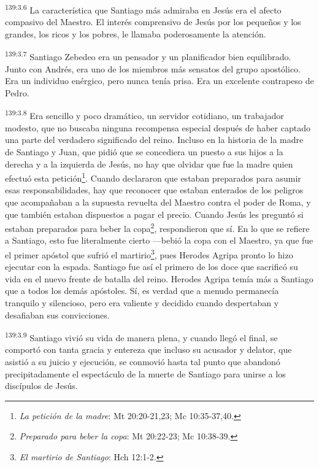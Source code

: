 \par 
\textsuperscript{139:3.6} La característica que Santiago más admiraba en Jesús era el afecto compasivo del Maestro. El interés comprensivo de Jesús por los pequeños y los grandes, los ricos y los pobres, le llamaba poderosamente la atención.

\par 
\textsuperscript{139:3.7} Santiago Zebedeo era un pensador y un planificador bien equilibrado. Junto con Andrés, era uno de los miembros más sensatos del grupo apostólico. Era un individuo enérgico, pero nunca tenía prisa. Era un excelente contrapeso de Pedro.

\par 
\textsuperscript{139:3.8} Era sencillo y poco dramático, un servidor cotidiano, un trabajador modesto, que no buscaba ninguna recompensa especial después de haber captado una parte del verdadero significado del reino. Incluso en la historia de la madre de Santiago y Juan, que pidió que se concediera un puesto a sus hijos a la derecha y a la izquierda de Jesús, no hay que olvidar que fue la madre quien efectuó esta petición\footnote{\textit{La petición de la madre}: Mt 20:20-21,23; Mc 10:35-37,40.}. Cuando declararon que estaban preparados para asumir esas responsabilidades, hay que reconocer que estaban enterados de los peligros que acompañaban a la supuesta revuelta del Maestro contra el poder de Roma, y que también estaban dispuestos a pagar el precio. Cuando Jesús les preguntó si estaban preparados para beber la copa\footnote{\textit{Preparado para beber la copa}: Mt 20:22-23; Mc 10:38-39.}, respondieron que sí. En lo que se refiere a Santiago, esto fue literalmente cierto ---bebió la copa con el Maestro, ya que fue el primer apóstol que sufrió el martirio\footnote{\textit{El martirio de Santiago}: Hch 12:1-2.}, pues Herodes Agripa pronto lo hizo ejecutar con la espada. Santiago fue así el primero de los doce que sacrificó su vida en el nuevo frente de batalla del reino. Herodes Agripa temía más a Santiago que a todos los demás apóstoles. Sí, es verdad que a menudo permanecía tranquilo y silencioso, pero era valiente y decidido cuando despertaban y desafiaban sus convicciones.

\par 
\textsuperscript{139:3.9} Santiago vivió su vida de manera plena, y cuando llegó el final, se comportó con tanta gracia y entereza que incluso su acusador y delator, que asistió a su juicio y ejecución, se conmovió hasta tal punto que abandonó precipitadamente el espectáculo de la muerte de Santiago para unirse a los discípulos de Jesús.

